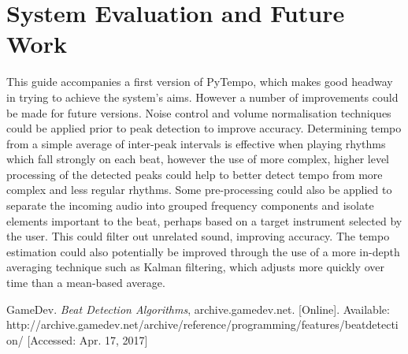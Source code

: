 \documentclass[hidelinks,12pt]{article}
\begin{document}
\section{System Evaluation and Future Work}
This guide accompanies a first version of PyTempo, which makes good headway in trying to achieve the system's aims. However a number of improvements could be made for future versions. Noise control and volume normalisation techniques could be applied prior to peak detection to improve accuracy. Determining tempo from a simple average of inter-peak intervals is effective when playing rhythms which fall strongly on each beat, however the use of more complex, higher level processing of the detected peaks could help to better detect tempo from more complex and less regular rhythms. Some pre-processing could also be applied to separate the incoming audio into grouped frequency components and isolate elements important to the beat, perhaps based on a target instrument selected by the user. This could filter out unrelated sound, improving accuracy. The tempo estimation could also potentially be improved through the use of a more in-depth averaging technique such as Kalman filtering, which adjusts more quickly over time than a mean-based average.

\begin{thebibliography}{9}
 GameDev. \textit{Beat Detection Algorithms},  archive.gamedev.net. [Online]. Available: http://archive.gamedev.net/archive/reference/programming/features/beatdetection/ [Accessed: Apr. 17, 2017]
\end{thebibliography}
\end{document}
